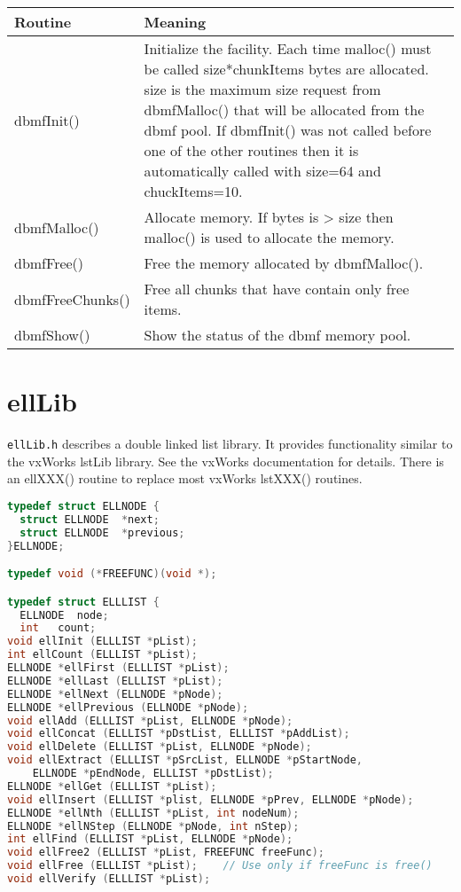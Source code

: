 \begin{center}
\begin{longtable}{p{1.3in}p{4.5in}}
\textbf{Routine} & \textbf{Meaning}\\
\hline
dbmfInit() & Initialize the facility. Each time malloc() must be called size*chunkItems bytes are allocated. size is the maximum size request from dbmfMalloc() that will be allocated from the dbmf pool. If dbmfInit() was not called before one of the other routines then it is automatically called with size=64 and chuckItems=10.\\
dbmfMalloc() & Allocate memory. If bytes is \textgreater{} size then malloc() is used to allocate the memory.\\
dbmfFree() & Free the memory allocated by dbmfMalloc().\\
dbmfFreeChunks() & Free all chunks that have contain only free items.\\
dbmfShow() & Show the status of the dbmf memory pool.
\end{longtable}

\end{center}


\section{ellLib}

\verb|ellLib.h| describes a double linked list library. It provides functionality similar to the vxWorks lstLib library. See the 
vxWorks documentation for details. There is an ellXXX() routine to replace most vxWorks lstXXX() routines.

\begin{lstlisting}[language=C]
typedef struct ELLNODE {
  struct ELLNODE  *next;
  struct ELLNODE  *previous;
}ELLNODE;

typedef void (*FREEFUNC)(void *);

typedef struct ELLLIST {
  ELLNODE  node;
  int   count;
void ellInit (ELLLIST *pList);
int ellCount (ELLLIST *pList);
ELLNODE *ellFirst (ELLLIST *pList);
ELLNODE *ellLast (ELLLIST *pList);
ELLNODE *ellNext (ELLNODE *pNode);
ELLNODE *ellPrevious (ELLNODE *pNode);
void ellAdd (ELLLIST *pList, ELLNODE *pNode);
void ellConcat (ELLLIST *pDstList, ELLLIST *pAddList);
void ellDelete (ELLLIST *pList, ELLNODE *pNode);
void ellExtract (ELLLIST *pSrcList, ELLNODE *pStartNode,
    ELLNODE *pEndNode, ELLLIST *pDstList);
ELLNODE *ellGet (ELLLIST *pList);
void ellInsert (ELLLIST *plist, ELLNODE *pPrev, ELLNODE *pNode);
ELLNODE *ellNth (ELLLIST *pList, int nodeNum);
ELLNODE *ellNStep (ELLNODE *pNode, int nStep);
int ellFind (ELLLIST *pList, ELLNODE *pNode);
void ellFree2 (ELLLIST *pList, FREEFUNC freeFunc);
void ellFree (ELLLIST *pList);    // Use only if freeFunc is free()
void ellVerify (ELLLIST *pList);
\end{lstlisting}

